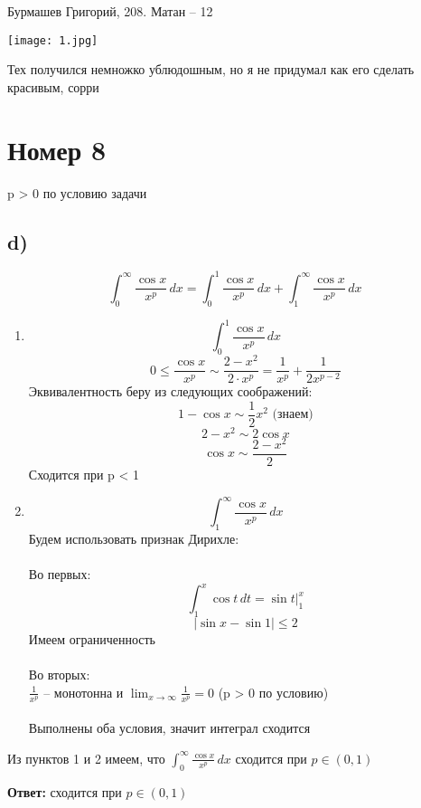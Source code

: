 \documentclass[a4paper,12pt]{article}
\author{Бурмашев Григорий, БПМИ-208}
\title{}
\date{\today}
\begin{document}
\begin{center}
Бурмашев Григорий, 208.  Матан -- 12
\end{center}
\begin{center}
\texttt{[image: 1.jpg]}
\end{center}
\begin{center}
Тех получился немножко ублюдошным, но я не придумал как его сделать красивым, сорри
\end{center}
\clearpage
\section*{ Номер 8}
p > 0 по условию задачи
\subsection*{d)}
\[
\int_{0}^{\infty} \frac{ \cos x}{x^p} \, dx = \int_{0}^{1} \frac{ \cos x}{x^p} \, dx  + \int_{1}^{\infty} \frac{ \cos x}{x^p} \, dx 
\]
\begin{enumerate}
\item
\[
\int_{0}^{1} \frac{ \cos x}{x^p} \, dx
\]
\[
0 \leq \frac{\cos x}{x^p} \sim \frac{2 - x^2}{2 \cdot x^p} = \frac{1}{x^p} + \frac{1}{2x^{p-2}}
\]
Эквивалентность беру из следующих соображений:
\[
1 - \cos x \sim \frac{1}{2} x^2 \text{  (знаем)}
\]
\[
2 - x^2 \sim 2\cos x
\]
\[
\cos x \sim \frac{2 - x^2}{2}
\]
Сходится при p < 1
\item
\[
\int_{1}^{\infty} \frac{ \cos x}{x^p} \, dx
\]
Будем использовать признак Дирихле:
\\\\
Во первых:
\[
\int_{1}^{x} \cos t \, dt = \sin t \bigg|_1^x
\]
\[
|\sin x  - \sin 1| \leq 2 
\]
Имеем ограниченность
\\\\
Во вторых:
\\
$\frac{1}{x^p} $ -- монотонна и $\lim_{x \rightarrow \infty} \frac{1}{x^p} = 0 $ (p > 0 по условию)
\\\\
Выполнены оба условия, значит интеграл сходится
\end{enumerate}
Из пунктов 1 и 2 имеем, что $\int_{0}^{\infty} \frac{ \cos x}{x^p} \, dx$  сходится при $p \in (0, 1)$
{\Large \begin{center}
\textbf{Ответ: } сходится при $p \in (0, 1)$
\end{center}}
\end{document}
